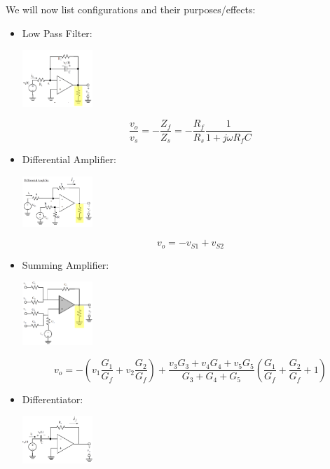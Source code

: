\documentclass[nobib]{tufte-handout}
\begin{document}
We will now list configurations and their purposes/effects:
\begin{itemize}
    \item Low Pass Filter:
          \begin{center}
              \includegraphics[width = 100px]{images/opamplow2.png}
          \end{center}
          \begin{equation*}
              \frac{v_o}{v_s} = -\frac{Z_f}{Z_s} = -\frac{R_f}{R_s}\frac{1}{1+j\omega R_fC}
          \end{equation*}
    \item Differential Amplifier:
          \begin{center}
              \includegraphics[width = 100px]{images/diffamp.png}
          \end{center}
          \begin{equation*}
              v_o = -v_{S1}+v_{S2}
          \end{equation*}
    \item Summing Amplifier:
          \begin{center}
              \includegraphics[width = 100px]{images/sumamp.png}
          \end{center}
          \begin{equation*}
              v_o = -\left(v_1\frac{G_1}{G_f}+v_2\frac{G_2}{G_f}\right)+\frac{v_3G_3+v_4G_4+v_5G_5}{G_3+G_4+G_5}\left(\frac{G_1}{G_f}+\frac{G_2}{G_f}+1\right)
          \end{equation*}
    \item Differentiator:
          \begin{center}
              \includegraphics[width = 100px]{images/differentiator.png}

\end{center}
\end{itemize}
\end{document}
